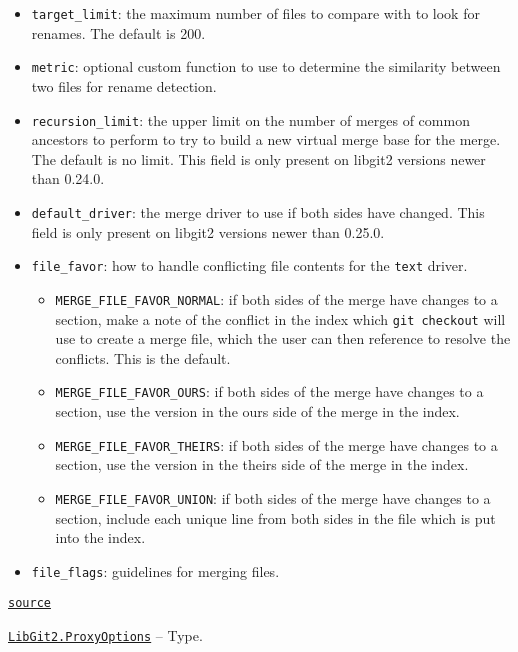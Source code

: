 \begin{adjustwidth}{2em}{0pt}
\begin{itemize}
\item \texttt{target\_limit}: the maximum number of files to compare with to look for renames. The default is 200.


\item \texttt{metric}: optional custom function to use to determine the similarity between two files for rename detection.


\item \texttt{recursion\_limit}: the upper limit on the number of merges of common ancestors to perform to try to build a new virtual merge base for the merge. The default is no limit. This field is only present on libgit2 versions newer than 0.24.0.


\item \texttt{default\_driver}: the merge driver to use if both sides have changed. This field is only present on libgit2 versions newer than 0.25.0.


\item \texttt{file\_favor}: how to handle conflicting file contents for the \texttt{text} driver.

\begin{itemize}
\item \texttt{MERGE\_FILE\_FAVOR\_NORMAL}: if both sides of the merge have changes to a section,  make a note of the conflict in the index which \texttt{git checkout} will use to create  a merge file, which the user can then reference to resolve the conflicts. This is  the default.


\item \texttt{MERGE\_FILE\_FAVOR\_OURS}: if both sides of the merge have changes to a section,  use the version in the {\textquotedbl}ours{\textquotedbl} side of the merge in the index.


\item \texttt{MERGE\_FILE\_FAVOR\_THEIRS}: if both sides of the merge have changes to a section,  use the version in the {\textquotedbl}theirs{\textquotedbl} side of the merge in the index.


\item \texttt{MERGE\_FILE\_FAVOR\_UNION}: if both sides of the merge have changes to a section,  include each unique line from both sides in the file which is put into the index.

\end{itemize}

\item \texttt{file\_flags}: guidelines for merging files.

\end{itemize}


\href{https://github.com/JuliaLang/julia/blob/44fa15b1502a45eac76c9017af94332d4557b251/base/#L0-L42}{\texttt{source}}


\end{adjustwidth}
\hypertarget{1179613637206861638}{} 
\hyperlink{1179613637206861638}{\texttt{LibGit2.ProxyOptions}}  -- {Type.}

